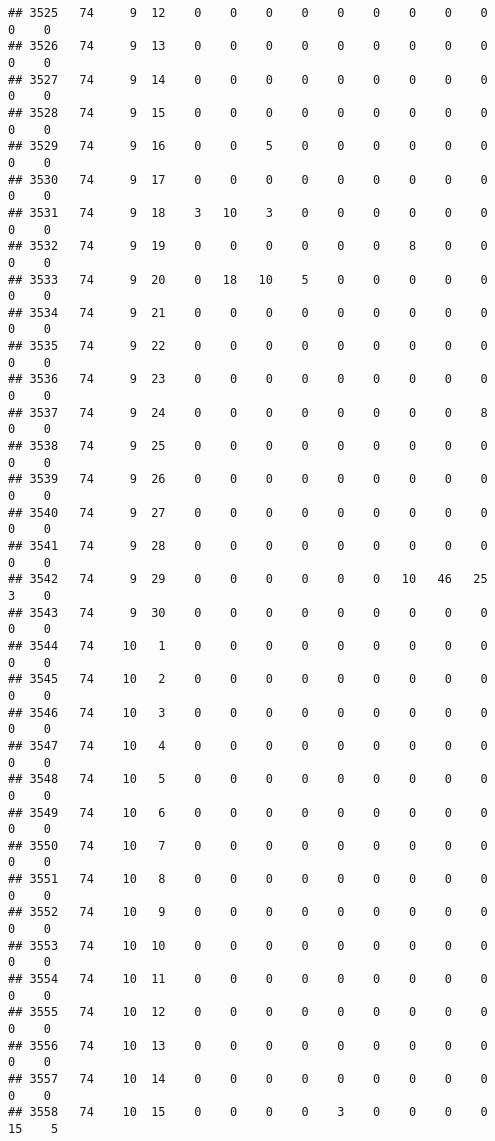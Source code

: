 \documentclass[]{article}
\begin{document}
\begin{verbatim}
## 3525   74     9  12    0    0    0    0    0    0    0    0    0    0    0
## 3526   74     9  13    0    0    0    0    0    0    0    0    0    0    0
## 3527   74     9  14    0    0    0    0    0    0    0    0    0    0    0
## 3528   74     9  15    0    0    0    0    0    0    0    0    0    0    0
## 3529   74     9  16    0    0    5    0    0    0    0    0    0    0    0
## 3530   74     9  17    0    0    0    0    0    0    0    0    0    0    0
## 3531   74     9  18    3   10    3    0    0    0    0    0    0    0    0
## 3532   74     9  19    0    0    0    0    0    0    8    0    0    0    0
## 3533   74     9  20    0   18   10    5    0    0    0    0    0    0    0
## 3534   74     9  21    0    0    0    0    0    0    0    0    0    0    0
## 3535   74     9  22    0    0    0    0    0    0    0    0    0    0    0
## 3536   74     9  23    0    0    0    0    0    0    0    0    0    0    0
## 3537   74     9  24    0    0    0    0    0    0    0    0    8    0    0
## 3538   74     9  25    0    0    0    0    0    0    0    0    0    0    0
## 3539   74     9  26    0    0    0    0    0    0    0    0    0    0    0
## 3540   74     9  27    0    0    0    0    0    0    0    0    0    0    0
## 3541   74     9  28    0    0    0    0    0    0    0    0    0    0    0
## 3542   74     9  29    0    0    0    0    0    0   10   46   25    3    0
## 3543   74     9  30    0    0    0    0    0    0    0    0    0    0    0
## 3544   74    10   1    0    0    0    0    0    0    0    0    0    0    0
## 3545   74    10   2    0    0    0    0    0    0    0    0    0    0    0
## 3546   74    10   3    0    0    0    0    0    0    0    0    0    0    0
## 3547   74    10   4    0    0    0    0    0    0    0    0    0    0    0
## 3548   74    10   5    0    0    0    0    0    0    0    0    0    0    0
## 3549   74    10   6    0    0    0    0    0    0    0    0    0    0    0
## 3550   74    10   7    0    0    0    0    0    0    0    0    0    0    0
## 3551   74    10   8    0    0    0    0    0    0    0    0    0    0    0
## 3552   74    10   9    0    0    0    0    0    0    0    0    0    0    0
## 3553   74    10  10    0    0    0    0    0    0    0    0    0    0    0
## 3554   74    10  11    0    0    0    0    0    0    0    0    0    0    0
## 3555   74    10  12    0    0    0    0    0    0    0    0    0    0    0
## 3556   74    10  13    0    0    0    0    0    0    0    0    0    0    0
## 3557   74    10  14    0    0    0    0    0    0    0    0    0    0    0
## 3558   74    10  15    0    0    0    0    3    0    0    0    0   15    5

\end{verbatim}
\end{document}
